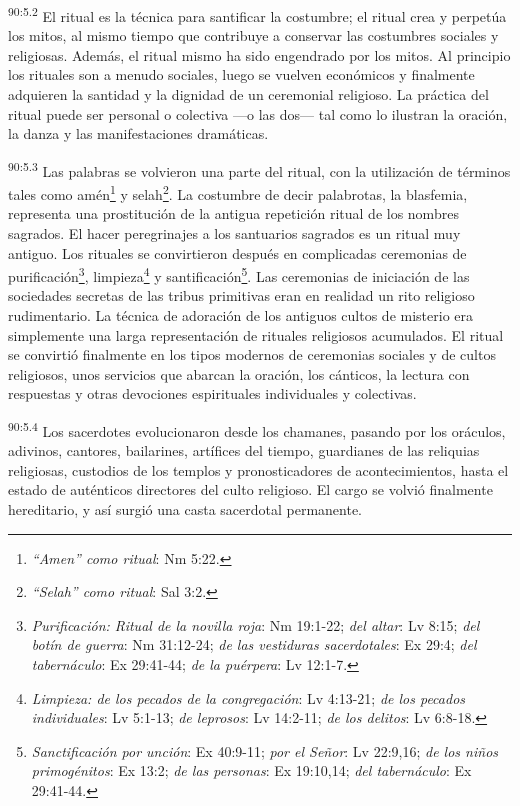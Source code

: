 \par
\textsuperscript{90:5.2} El ritual es la técnica para santificar la costumbre; el ritual crea y perpetúa los mitos, al mismo tiempo que contribuye a conservar las costumbres sociales y religiosas. Además, el ritual mismo ha sido engendrado por los mitos. Al principio los rituales son a menudo sociales, luego se vuelven económicos y finalmente adquieren la santidad y la dignidad de un ceremonial religioso. La práctica del ritual puede ser personal o colectiva ---o las dos--- tal como lo ilustran la oración, la danza y las manifestaciones dramáticas.

\par
\textsuperscript{90:5.3} Las palabras se volvieron una parte del ritual, con la utilización de términos tales como amén\footnote{\textit{``Amen'' como ritual}: Nm 5:22.} y selah\footnote{\textit{``Selah''  como ritual}: Sal 3:2.}. La costumbre de decir palabrotas, la blasfemia, representa una prostitución de la antigua repetición ritual de los nombres sagrados. El hacer peregrinajes a los santuarios sagrados es un ritual muy antiguo. Los rituales se convirtieron después en complicadas ceremonias de purificación\footnote{\textit{Purificación: Ritual de la novilla roja}: Nm 19:1-22; \textit{del altar}: Lv 8:15; \textit{del botín de guerra}: Nm 31:12-24; \textit{de las vestiduras sacerdotales}: Ex 29:4; \textit{del tabernáculo}: Ex 29:41-44; \textit{de la puérpera}: Lv 12:1-7.}, limpieza\footnote{\textit{Limpieza: de los pecados de la congregación}: Lv 4:13-21; \textit{de los pecados individuales}: Lv 5:1-13; \textit{de leprosos}: Lv 14:2-11; \textit{de los delitos}: Lv 6:8-18.} y santificación\footnote{\textit{Sanctificación por unción}: Ex 40:9-11; \textit{por el Señor}: Lv 22:9,16; \textit{de los niños primogénitos}: Ex 13:2; \textit{de las personas}: Ex 19:10,14; \textit{del tabernáculo}: Ex 29:41-44.}. Las ceremonias de iniciación de las sociedades secretas de las tribus primitivas eran en realidad un rito religioso rudimentario. La técnica de adoración de los antiguos cultos de misterio era simplemente una larga representación de rituales religiosos acumulados. El ritual se convirtió finalmente en los tipos modernos de ceremonias sociales y de cultos religiosos, unos servicios que abarcan la oración, los cánticos, la lectura con respuestas y otras devociones espirituales individuales y colectivas.

\par
\textsuperscript{90:5.4} Los sacerdotes evolucionaron desde los chamanes, pasando por los oráculos, adivinos, cantores, bailarines, artífices del tiempo, guardianes de las reliquias religiosas, custodios de los templos y pronosticadores de acontecimientos, hasta el estado de auténticos directores del culto religioso. El cargo se volvió finalmente hereditario, y así surgió una casta sacerdotal permanente.

